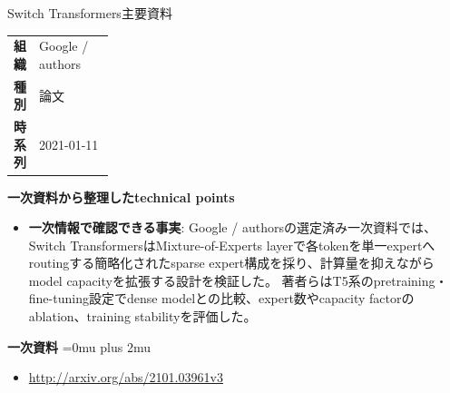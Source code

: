 \begin{technicalnote}{Switch Transformers}{主要資料}
\begingroup
\begin{tabularx}{\linewidth}{@{}>{\bfseries}p{0.22\linewidth}X@{}}
組織 & Google / authors \\
種別 & 論文 \\
時系列 & 2021-01-11 \\
\end{tabularx}
\smallskip
{\bfseries 一次資料から整理したtechnical points}
\begin{itemize}[leftmargin=1.5em,itemsep=0.35em]
\item \textbf{一次情報で確認できる事実}: Google / authorsの選定済み一次資料では、Switch TransformersはMixture-of-Experts layerで各tokenを単一expertへroutingする簡略化されたsparse expert構成を採り、計算量を抑えながらmodel capacityを拡張する設計を検証した。 著者らはT5系のpretraining・fine-tuning設定でdense modelとの比較、expert数やcapacity factorのablation、training stabilityを評価した。
\end{itemize}
\begin{minipage}{\linewidth}
\begin{samepage}
{\bfseries 一次資料}
\begingroup\sloppy
\Urlmuskip=0mu plus 2mu\relax
\begin{itemize}[leftmargin=1.5em,itemsep=0.25em]
\item {\scriptsize\url{http://arxiv.org/abs/2101.03961v3}}
\end{itemize}
\endgroup
\end{samepage}
\end{minipage}
\endgroup
\end{technicalnote}
\medskip


